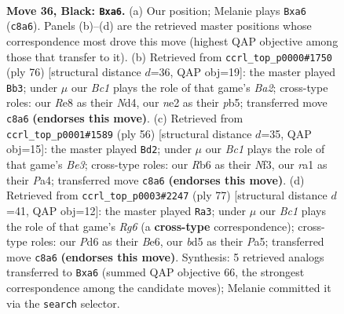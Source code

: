 \documentclass[11pt]{article}
\begin{document}
\clearpage

\begin{figure}[p]\centering
\begin{subfigure}{0.46\textwidth}\centering
\resizebox{\linewidth}{!}{%
\newchessgame
\chessboard[
  setfen={2b1r3/p7/Pr1p4/2pB2k1/2P5/6P1/4NR1K/R7 b - - 2 36},
  showmover=false,
  pgfstyle=straightmove, color=movearrow, markmove={c8-a6}
]}
\caption{}
\end{subfigure}\hfill
\begin{subfigure}{0.46\textwidth}\centering
\resizebox{\linewidth}{!}{%
\newchessgame
\chessboard[
  setfen={R7/1r1bn1k1/5p2/1p1p3p/3N1P2/6P1/B4K1P/8 w - - 0 39},
  showmover=false,
  pgfstyle=straightmove, color=movearrow, markmove={a2-b3}
]}
\caption{}
\end{subfigure}
\\[4pt]
\begin{subfigure}{0.46\textwidth}\centering
\resizebox{\linewidth}{!}{%
\newchessgame
\chessboard[
  setfen={5n2/1pr3b1/p3k1pp/8/P7/1R2BN1P/1P4P1/1K6 w - - 2 29},
  showmover=false,
  pgfstyle=straightmove, color=movearrow, markmove={e3-d2}
]}
\caption{}
\end{subfigure}\hfill
\begin{subfigure}{0.46\textwidth}\centering
\resizebox{\linewidth}{!}{%
\newchessgame
\chessboard[
  setfen={8/4k3/1p2b2p/p3r2P/P2R4/6r1/2BK3R/8 b - - 2 39},
  showmover=false,
  pgfstyle=straightmove, color=movearrow, markmove={g3-a3}
]}
\caption{}
\end{subfigure}
\caption{\textbf{Move 36, Black: \texttt{Bxa6}.} (a) Our position; Melanie plays \texttt{Bxa6} (\texttt{c8a6}). Panels (b)--(d) are the retrieved master positions whose correspondence most drove this move (highest QAP objective among those that transfer to it). (b) Retrieved from \texttt{ccrl\_top\_p0000\#1750} (ply 76) [structural distance $d$=36, QAP obj=19]: the master played \texttt{Bb3}; under $\mu$ our \emph{Bc1} plays the role of that game's \emph{Ba2}; cross-type roles: our \emph{R}e8 as their \emph{N}d4, our \emph{n}e2 as their \emph{p}b5; transferred move \texttt{c8a6} \textbf{(endorses this move)}. (c) Retrieved from \texttt{ccrl\_top\_p0001\#1589} (ply 56) [structural distance $d$=35, QAP obj=15]: the master played \texttt{Bd2}; under $\mu$ our \emph{Bc1} plays the role of that game's \emph{Be3}; cross-type roles: our \emph{R}b6 as their \emph{N}f3, our \emph{r}a1 as their \emph{P}a4; transferred move \texttt{c8a6} \textbf{(endorses this move)}. (d) Retrieved from \texttt{ccrl\_top\_p0003\#2247} (ply 77) [structural distance $d$=41, QAP obj=12]: the master played \texttt{Ra3}; under $\mu$ our \emph{Bc1} plays the role of that game's \emph{Rg6} (a \textbf{cross-type} correspondence); cross-type roles: our \emph{P}d6 as their \emph{B}e6, our \emph{b}d5 as their \emph{P}a5; transferred move \texttt{c8a6} \textbf{(endorses this move)}. Synthesis: 5 retrieved analogs transferred to \texttt{Bxa6} (summed QAP objective 66, the strongest correspondence among the candidate moves); Melanie committed it via the \texttt{search} selector.}
\label{fig:thought-m71}
\end{figure}
\end{document}
